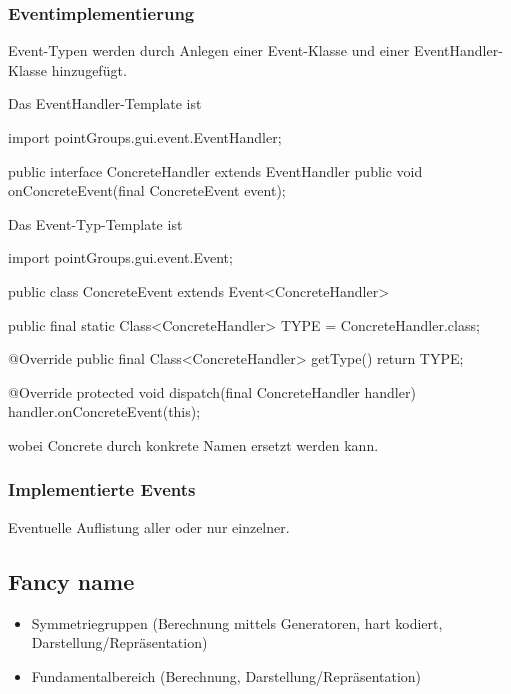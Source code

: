         \subsubsection*{Eventimplementierung}
            Event-Typen werden durch Anlegen einer Event-Klasse und einer EventHandler-Klasse hinzugefügt.

            Das EventHandler-Template ist
            
            \begin{code}
                import pointGroups.gui.event.EventHandler;

                public interface ConcreteHandler
                    extends EventHandler
                {
                    public void onConcreteEvent(final ConcreteEvent event);
                }
            \end{code}

            Das Event-Typ-Template ist

            \begin{code}            
                import pointGroups.gui.event.Event;

                public class ConcreteEvent
                    extends Event<ConcreteHandler>
                {
                    public final static Class<ConcreteHandler> TYPE =
                        ConcreteHandler.class;

                    @Override
                    public final Class<ConcreteHandler> getType() {
                        return TYPE;
                    }

                    @Override
                    protected void dispatch(final ConcreteHandler handler) {
                        handler.onConcreteEvent(this);
                    }
                } 
            \end{code}
            
            wobei Concrete durch konkrete Namen ersetzt werden kann.
            
        \subsubsection*{Implementierte Events}
            Eventuelle Auflistung aller oder nur einzelner.
                
\subsection{Fancy name}
    \begin{itemize}
        \item Symmetriegruppen (Berechnung mittels Generatoren, hart kodiert, Darstellung/Repräsentation)
        \item Fundamentalbereich (Berechnung, Darstellung/Repräsentation)
    \end{itemize}
    
